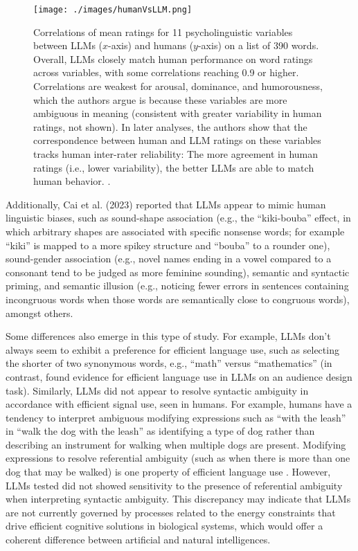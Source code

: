 \begin{figure}[ht]
\centering
\texttt{[image: ./images/humanVsLLM.png]}
\caption[Figure borrowed from Kello et al. (2025, under review) with author
permission.]{Correlations of mean ratings  for 11 psycholinguistic variables
between LLMs ($x$-axis) and humans ($y$-axis) on a list of 390 words. Overall,
LLMs closely match human performance on word ratings across variables, with
some correlations reaching 0.9 or higher. Correlations are weakest for arousal,
dominance, and humorousness, which the authors argue is because these variables
are more ambiguous in meaning (consistent with greater variability in human
ratings, not shown). In later analyses, the authors show that the
correspondence between human and LLM ratings on these variables tracks human
inter-rater reliability: The more agreement in human ratings (i.e., lower
variability), the better LLMs are able to match human behavior. .}
\label{humanVsLLM}
\end{figure}

Additionally, Cai et al. (2023) reported that LLMs appear to mimic human
linguistic biases, such as sound-shape association (e.g., the ``kiki-bouba''
effect, in which arbitrary shapes are associated with specific nonsense words;
for example ``kiki'' is mapped to a more spikey structure and ``bouba'' to a
rounder one), sound-gender association (e.g., novel names ending in a vowel
compared to a consonant tend to be judged as more feminine sounding), semantic
and syntactic priming, and semantic illusion (e.g., noticing fewer errors in
sentences containing incongruous words when those words are semantically close
to congruous words), amongst others.

Some differences also emerge in this type of study.  For example, LLMs don't
always seem to exhibit a preference for efficient language use, such as selecting the
shorter of two synonymous words, e.g.,  ``math'' versus ``mathematics''  \cite{cai2023do} (in contrast,  \cite{RyskinEtAl2025EfficientAudienceDesign} found evidence for efficient language use in LLMs on an audience design task).
Similarly,  LLMs did not appear to resolve syntactic ambiguity in accordance
with efficient signal use, seen in humans. For example, humans have a tendency
to interpret ambiguous modifying expressions such as ``with the leash'' in
``walk the dog with the leash'' as identifying a type of dog rather than
describing an instrument for walking when multiple dogs are present. Modifying
expressions to resolve referential ambiguity (such as when there is more than
one dog that may be walked) is one property of efficient language use
\cite{frank2012predicting}. However, LLMs tested did not showed sensitivity to
the presence of referential ambiguity when interpreting syntactic ambiguity.
This discrepancy may indicate that LLMs are not currently governed by processes
related to the energy constraints that drive efficient cognitive solutions in
biological systems, which would offer a coherent difference between artificial
and natural intelligences.

